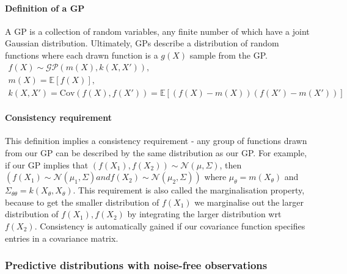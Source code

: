 \paragraph{Definition of a GP}
A GP is a collection of random variables, any finite number of which have a joint Gaussian distribution. Ultimately, GPs describe a distribution of random functions where each drawn function is a $g(X)$ sample from the GP.
\begin{equation*}
    \begin{aligned}
        f(X) \sim \mathcal{GP}(m(X), k(X,X')), \\
        m(X) = \mathbb{E}[f(X)], \\
        k(X,X') = \text{Cov}(f(X), f(X')) = \mathbb{E}[(f(X) - m(X))(f(X') - m(X'))]
    \end{aligned}
\end{equation*}

\paragraph{Consistency requirement}
This definition implies a consistency requirement - any group of functions drawn from our GP can be described by the same distribution as our GP. For example, if our GP implies that $(f(X_1), f(X_2)) \sim \mathcal{N}(\mu, \Sigma)$, then $(f(X_1) \sim \mathcal{N}(\mu_1, \Sigma) and f(X_2) \sim \mathcal{N}(\mu_2, \Sigma))$ where $\mu_{\theta} = m(X_{\theta})$ and $\Sigma_{\theta\theta} = k(X_{\theta}, X_{\theta})$. This requirement is also called the marginalisation property, because to get the smaller distribution of $f(X_1)$ we marginalise out the larger distribution of $f(X_1), f(X_2)$ by integrating the larger distribution wrt $f(X_2)$. Consistency is automatically gained if our covariance function specifies entries in a covariance matrix.
    
\subsubsection{Predictive distributions with noise-free observations}
